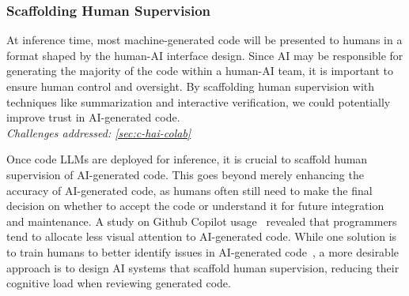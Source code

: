 \subsubsection{Scaffolding Human Supervision}
\label{d:sec-human-supervision}
\begin{tcolorbox}[colback=lightorange, boxrule=0pt, arc=5pt, outer arc=5pt]
At inference time, most machine-generated code will be presented to humans in a format shaped by the human-AI interface design. Since AI may be responsible for generating the majority of the code within a human-AI team, it is important to ensure human control and oversight. By scaffolding human supervision with techniques like summarization and interactive verification, we could potentially improve trust in AI-generated code.
\newline \\
\textit{Challenges addressed: \ref{sec:c-hai-colab}}
\end{tcolorbox}
Once code LLMs are deployed for inference, it is crucial to scaffold human supervision of AI-generated code. This goes beyond merely enhancing the accuracy of AI-generated code, as humans often still need to make the final decision on whether to accept the code or understand it for future integration and maintenance. A study on Github Copilot usage~\citep{10.1145/3551349.3560438} revealed that programmers tend to allocate less visual attention to AI-generated code. %
While one solution is to train humans to better identify issues in AI-generated code~\citep{10.1145/3627217.3627238}, a more desirable approach is to design AI systems that scaffold human supervision, reducing their cognitive load when reviewing generated code.

